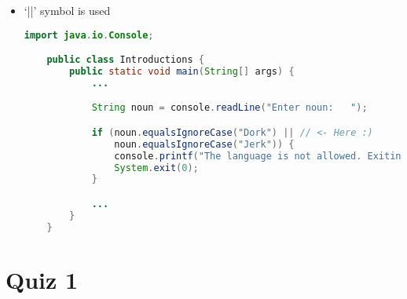 \documentclass[12pt]{article}
\begin{document}
\bigskip

\begin{itemize}
    \item `||' symbol is used

    \begin{lstlisting}[language=Java]
    import java.io.Console;

    public class Introductions {
        public static void main(String[] args) {
            ...

            String noun = console.readLine("Enter noun:   ");

            if (noun.equalsIgnoreCase("Dork") || // <- Here :)
                noun.equalsIgnoreCase("Jerk")) {
                console.printf("The language is not allowed. Exiting\n");
                System.exit(0);
            }

            ...
        }
    }
    \end{lstlisting}
\end{itemize}

\section{Quiz 1}

\bigskip
\end{document}
